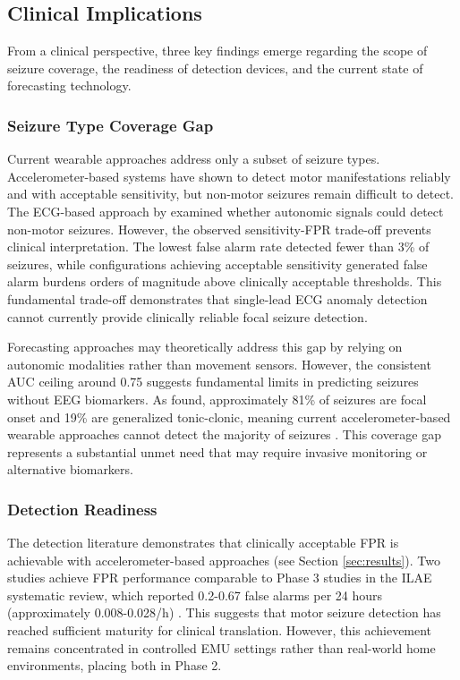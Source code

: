 \subsection{Clinical Implications}

From a clinical perspective, three key findings emerge regarding the scope of seizure coverage, the readiness of detection devices, and the current state of forecasting technology.

\subsubsection{Seizure Type Coverage Gap}

Current wearable approaches address only a subset of seizure types. Accelerometer-based systems have shown to detect motor manifestations reliably and with acceptable sensitivity, but non-motor seizures remain difficult to detect. The ECG-based approach by \textcite{reintjesECGBasedDetectionEpileptic2025} examined whether autonomic signals could detect non-motor seizures. However, the observed sensitivity-FPR trade-off prevents clinical interpretation. The lowest false alarm rate detected fewer than 3\% of seizures, while configurations achieving acceptable sensitivity generated false alarm burdens orders of magnitude above clinically acceptable thresholds. This fundamental trade-off demonstrates that single-lead ECG anomaly detection cannot currently provide clinically reliable focal seizure detection.

Forecasting approaches may theoretically address this gap by relying on autonomic modalities rather than movement sensors. However, the consistent AUC ceiling around 0.75 suggests fundamental limits in predicting seizures without EEG biomarkers. As \textcite{ayubNaturalHistoryGeneralized2020} found, approximately 81\% of seizures are focal onset and 19\% are generalized tonic-clonic, meaning current accelerometer-based wearable approaches cannot detect the majority of seizures \parencite{ayubNaturalHistoryGeneralized2020}. This coverage gap represents a substantial unmet need that may require invasive monitoring or alternative biomarkers.

\subsubsection{Detection Readiness}
\label{EMU-to-home}
The detection literature demonstrates that clinically acceptable FPR is achievable with accelerometer-based approaches (see Section \ref{sec:results}). Two studies achieve FPR performance comparable to Phase 3 studies in the ILAE systematic review, which reported 0.2-0.67 false alarms per 24 hours (approximately 0.008-0.028/h) \parencite{beniczkyAutomatedSeizureDetection2021}. This suggests that motor seizure detection has reached sufficient maturity for clinical translation. However, this achievement remains concentrated in controlled EMU settings rather than real-world home environments, placing both in Phase 2.

